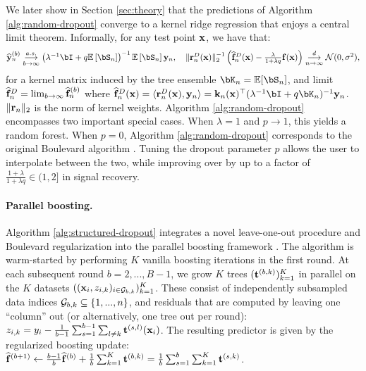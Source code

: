 We later show in Section \ref{sec:theory} that the predictions of Algorithm \ref{alg:random-dropout} converge to a kernel ridge regression that enjoys a central limit theorem. Informally, for any test point $\mathbf{x}$, we have that:
$$\textstyle{\widehat{\by}^{(b)}_n \underset{b\to\infty}{\overset{a.s.}{\longrightarrow}} \left(\lambda^{-1} \bI+q \mathbb{E}\left[\bS_n\right]\right)^{-1} \mathbb{E}\left[\bS_n\right]\by_n, \quad\lVert\br_n^D(\bx)\rVert_2^{-1}\left(\widehat{\f}_n^D(\bx) - \frac{\lambda}{1+\lambda q}\f(\bx)\right) \underset{n\to\infty}{\overset{d}{\longrightarrow}} \gN(0, \sigma^2)},$$
for a kernel matrix induced by the tree ensemble $\bK_n = \E[\bS_n]$, and limit $\widehat{\mathbf{f}}_{n}^D = \lim_{b \to \infty} \widehat{\mathbf{f}}^{(b)}_{n}$ where $\widehat{\f}_n^D(\bx) = \langle\br_n^D(\bx),  \by_n\rangle = \bk_n(\bx)^\top (\lambda^{-1}\bI + q\bK_n)^{-1}\by_n$. $\lVert\mathbf{r}_n\rVert_2$ is the norm of kernel weights. Algorithm \ref{alg:random-dropout} encompasses two important special cases. When $\lambda=1$ and $p\to 1$, this yields a random forest. When $p=0$, Algorithm \ref{alg:random-dropout} corresponds to the original Boulevard algorithm \citep{zhou2022boulevard}. Tuning the dropout parameter $p$ allows the user to interpolate between the two, while improving over \cite{zhou2022boulevard} by up to a factor of $\frac{1+\lambda}{1+\lambda q} \in (1, 2]$ in signal recovery.%



\vspace{-2ex}
\paragraph{Parallel boosting.} Algorithm \ref{alg:structured-dropout} integrates a novel leave-one-out procedure and Boulevard regularization into the parallel boosting framework \citep{long2011parallelmargin, karbasi2023impossibilityparallelizingboosting, dacunha2024optimalparallelizationboosting}. The algorithm is warm-started by performing $K$ vanilla boosting iterations in the first round. At each subsequent round $b=2,...,B-1$, we grow $K$ trees $(\mathbf{t}^{(b,k)})_{k=1}^K$ in parallel on the $K$ datasets $((\mathbf{x}_i, z_{i,k})_{i \in {\mathcal{G}}_{b,k}})_{k=1}^K$. These consist of independently subsampled data indices ${\mathcal{G}}_{b,k} \subseteq \{1,...,n\}$, and residuals that are computed by leaving one ``column'' out (or alternatively, one tree out per round): $z_{i,k} = y_i - \frac{1}{b-1}\sum_{s=1}^{b-1}\sum_{l\neq k}\mathbf{t}^{(s,l)}(\mathbf{x}_i)$. The resulting predictor is given by the regularized boosting update: $\widehat{\mathbf{f}}^{(b+1)} \gets \frac{b-1}{b} \widehat{\mathbf{f}}^{(b)} + \frac{1}{b} \sum_{k=1}^K \mathbf{t}^{(b,k)} = \frac{1}{b}\sum_{s=1}^{b}\sum_{k=1}^K \mathbf{t}^{(s,k)}$.

